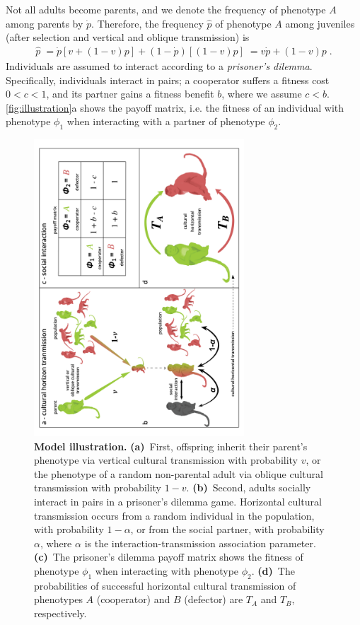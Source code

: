 \documentclass[12pt]{extarticle}
\begin{document}
Not all adults become parents, and we denote the frequency of phenotype $A$ among parents by $\dot{p}$.
Therefore, the frequency $\hat{p}$ of  phenotype $A$ among juveniles (after selection and vertical and oblique transmission) is
\begin{equation}\label{eq:horizontal}
\begin{aligned}
\hat{p} \;=
\dot{p} [v + (1-v)p] + (1-\dot{p}) [(1-v)p] \;= 
v \dot{p} + (1-v) p \;.
\end{aligned}
\end{equation}
Individuals are assumed to interact according to a \emph{prisoner's dilemma}.
Specifically, individuals interact in pairs; a cooperator suffers a fitness cost $0<c<1$, and its partner gains a fitness benefit $b$, where we assume $c<b$. \autoref{fig:illustration}a shows the payoff matrix, i.e. the fitness of an individual with phenotype $\phi_1$ when interacting with a partner of phenotype $\phi_2$.

\begin{figure}[pt]
  \centering
  \includegraphics[width=0.7\textwidth]{../PRSB_figures/fig_1.pdf}
  \caption{\textbf{Model illustration.} 
  \textbf{(a)}~First, offspring inherit their parent's phenotype via vertical cultural transmission with probability $v$, or the phenotype of a random non-parental adult via oblique cultural transmission with probability $1-v$.
  \textbf{(b)}~Second, adults socially interact in pairs in a prisoner's dilemma game. Horizontal cultural transmission occurs from a random individual in the population, with probability $1-\alpha$, or from the social partner, with probability $\alpha$, where $\alpha$ is the interaction-transmission association parameter.
  \textbf{(c)}~The prisoner's dilemma payoff matrix shows the fitness of phenotype $\phi_1$ when interacting with phenotype $\phi_2$.
    \textbf{(d)}~The probabilities of successful horizontal cultural transmission of phenotypes $A$ (cooperator) and $B$ (defector) are $T_A$ and $T_B$, respectively.
    }
  \label{fig:illustration}
\end{figure}
\end{document}
